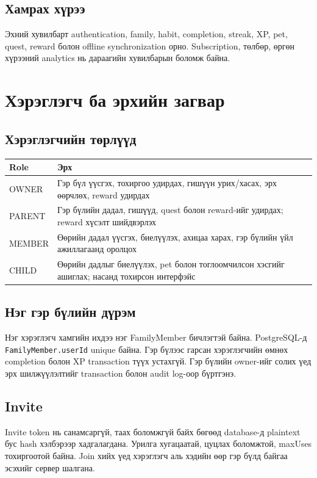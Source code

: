 \documentclass[12pt,a4paper,oneside]{report}
\begin{document}
\section{Хамрах хүрээ}
Эхний хувилбарт authentication, family, habit, completion, streak, XP, pet, quest, reward болон offline synchronization орно. Subscription, төлбөр, өргөн хүрээний analytics нь дараагийн хувилбарын боломж байна.

\chapter{Хэрэглэгч ба эрхийн загвар}

\section{Хэрэглэгчийн төрлүүд}
\begin{longtable}{p{}p{}}
\toprule
\textbf{Role} & \textbf{Эрх}\\
\midrule
OWNER & Гэр бүл үүсгэх, тохиргоо удирдах, гишүүн урих/хасах, эрх өөрчлөх, reward удирдах\\
PARENT & Гэр бүлийн дадал, гишүүд, quest болон reward-ийг удирдах; reward хүсэлт шийдвэрлэх\\
MEMBER & Өөрийн дадал үүсгэх, биелүүлэх, ахицаа харах, гэр бүлийн үйл ажиллагаанд оролцох\\
CHILD & Өөрийн дадлыг биелүүлэх, pet болон тоглоомчилсон хэсгийг ашиглах; насанд тохирсон интерфэйс\\
\bottomrule
\end{longtable}

\section{Нэг гэр бүлийн дүрэм}
Нэг хэрэглэгч хамгийн ихдээ нэг FamilyMember бичлэгтэй байна. PostgreSQL-д \texttt{FamilyMember.userId} unique байна. Гэр бүлээс гарсан хэрэглэгчийн өмнөх completion болон XP transaction түүх устахгүй. Гэр бүлийн owner-ийг солих үед эрх шилжүүлэлтийг transaction болон audit log-оор бүртгэнэ.

\section{Invite}
Invite token нь санамсаргүй, таах боломжгүй байх бөгөөд database-д plaintext бус hash хэлбэрээр хадгалагдана. Урилга хугацаатай, цуцлах боломжтой, maxUses тохиргоотой байна. Join хийх үед хэрэглэгч аль хэдийн өөр гэр бүлд байгаа эсэхийг сервер шалгана.
\end{document}
